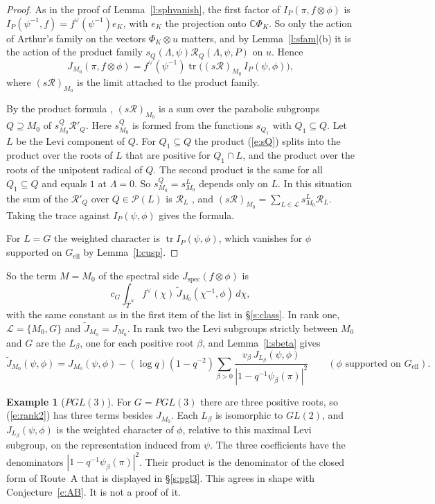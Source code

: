\documentclass[12pt,letterpaper]{article}
\numberwithin{equation}{section}
\theoremstyle{plain}
\theoremstyle{definition}
\newtheorem{example}[theorem]{Example}
\theoremstyle{remark}
\newcommand{\cP}{\mathcal{P}}
\newcommand{\cL}{\mathcal{L}}
\newcommand{\Thu}{\widehat{T}^{\,u}}
\DeclareMathOperator{\tr}{tr}
\newcommand{\ellr}{\mathrm{ell}}
\begin{document}
\begin{proof}
As in the proof of Lemma~\ref{l:sphvanish}, the first factor of $I_P(\pi,f\otimes\phi)$ is $I_P(\psi^{-1},f)=f^\vee(\psi^{-1})e_K$, with $e_K$ the projection onto $\mathbb{C}\Phi_K$. So only the action of Arthur's family on the vectors $\Phi_K\otimes u$ matters, and by Lemma~\ref{l:sfam}(b) it is the action of the product family $s_Q(\Lambda,\psi)\mathcal R_Q(\Lambda,\psi,P)$ on $u$. Hence
\[
J_{M_0}(\pi,f\otimes\phi)=f^\vee(\psi^{-1})\tr\big((s\mathcal R)_{M_0}\,I_P(\psi,\phi)\big),
\]
where $(s\mathcal R)_{M_0}$ is the limit attached to the product family.

By the product formula \cite[Lemma~6.3]{Ar81}, $(s\mathcal R)_{M_0}$ is a sum over the parabolic subgroups $Q\supseteq M_0$ of $s^Q_{M_0}\mathcal R'_Q$. Here $s^Q_{M_0}$ is formed from the functions $s_{Q_1}$ with $Q_1\subseteq Q$. Let $L$ be the Levi component of $Q$. For $Q_1\subseteq Q$ the product (\ref{e:sQ}) splits into the product over the roots of $L$ that are positive for $Q_1\cap L$, and the product over the roots of the unipotent radical of $Q$. The second product is the same for all $Q_1\subseteq Q$ and equals $1$ at $\Lambda=0$. So $s^Q_{M_0}=s^L_{M_0}$ depends only on $L$. In this situation the sum of the $\mathcal R'_Q$ over $Q\in\cP(L)$ is $\mathcal R_L$ \cite[Cor.~6.5]{Ar81}, and $(s\mathcal R)_{M_0}=\sum_{L\in\cL}s^L_{M_0}\mathcal R_L$. Taking the trace against $I_P(\psi,\phi)$ gives the formula.

For $L=G$ the weighted character is $\tr I_P(\psi,\phi)$, which vanishes for $\phi$ supported on $G_{\ellr}$ by Lemma~\ref{l:cusp}.
\end{proof}

So the term $M=M_0$ of the spectral side $J_{\mathrm{spec}}(f\otimes\phi)$ is
\[
c_G\int_{\Thu}f^\vee(\chi)\,\widetilde J_{M_0}(\chi^{-1},\phi)\,d\chi,
\]
with the same constant as in the first item of the list in \S\ref{s:class}. In rank one, $\cL=\{M_0,G\}$ and $\widetilde J_{M_0}=J_{M_0}$. In rank two the Levi subgroups strictly between $M_0$ and $G$ are the $L_\beta$, one for each positive root $\beta$, and Lemma~\ref{l:sbeta} gives
\begin{equation}\label{e:rank2}
\widetilde J_{M_0}(\psi,\phi)=J_{M_0}(\psi,\phi)-(\log q)(1-q^{-2})\sum_{\beta>0}\frac{v_\beta\,J_{L_\beta}(\psi,\phi)}{|1-q^{-1}\psi_\beta(\pi)|^2}\qquad(\phi\text{ supported on }G_{\ellr}).
\end{equation}

\begin{example}[$PGL(3)$]\label{ex:unnorm}
For $G=PGL(3)$ there are three positive roots, so (\ref{e:rank2}) has three terms besides $J_{M_0}$. Each $L_\beta$ is isomorphic to $GL(2)$, and $J_{L_\beta}(\psi,\phi)$ is the weighted character of $\phi$, relative to this maximal Levi subgroup, on the representation induced from $\psi$. The three coefficients have the denominators $|1-q^{-1}\psi_\beta(\pi)|^2$. Their product is the denominator of the closed form of Route~A that is displayed in \S\ref{s:pgl3}. This agrees in shape with Conjecture~\ref{c:AB}. It is not a proof of it.
\end{example}
\end{document}
